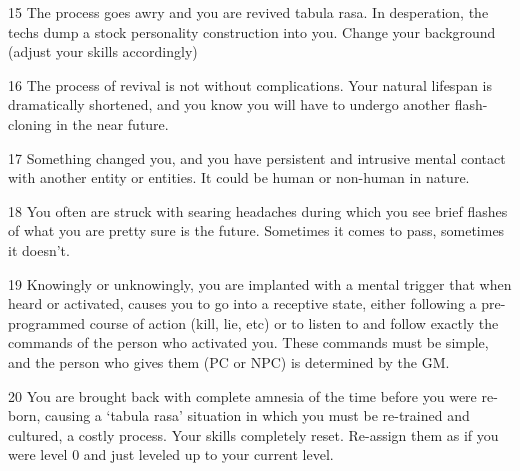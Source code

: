 15         The process goes awry and you are revived tabula rasa. In desperation, the techs dump a  
           stock personality construction into you. Change your background (adjust your skills  
           accordingly) 

16         The process of revival is not without complications. Your natural lifespan is dramatically  
           shortened, and you know you will have to undergo another flash-cloning in the near future.  

17         Something changed you, and you have persistent and intrusive mental contact with another  
           entity or entities. It could be human or non-human in nature. 

18         You often are struck with searing headaches during which you see brief flashes of what you  
           are pretty sure is the future. Sometimes it comes to pass, sometimes it doesn’t.  

                                                                                                                     


 19        Knowingly or unknowingly, you are implanted with a mental trigger that when heard or  
           activated, causes you to go into a receptive state, either following a pre-programmed course  
           of action (kill, lie, etc) or to listen to and follow exactly the commands of the person who  
           activated you. These commands must be simple, and the person who gives them (PC or NPC)  
           is determined by the GM.  

 20        You are brought back with complete amnesia of the time before you were re-born, causing a  
           ‘tabula rasa’ situation in which you must be re-trained and cultured, a costly process. Your  
           skills completely reset. Re-assign them as if you were level 0 and just leveled up to your  
           current level. 

                                                                                                                        
                                                                                                                   


                                                                                                                 
